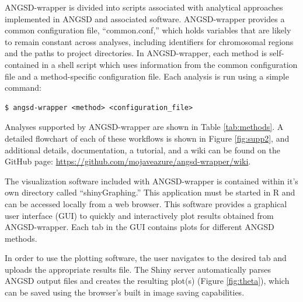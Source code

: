 \documentclass[10pt,a4paper]{article}
\begin{document}
ANGSD-wrapper is divided into scripts associated with analytical approaches implemented in ANGSD and associated software. 
ANGSD-wrapper provides a common configuration file, ``common.conf,'' which holds variables that are likely to remain constant across analyses, including identifiers for chromosomal regions and the paths to project directories.
In ANGSD-wrapper, each method is self-contained in a shell script which uses information from the common configuration file and a method-specific configuration file. 
Each analysis is run using a simple command:

\begin{lstlisting}
$ angsd-wrapper <method> <configuration_file>
\end{lstlisting}

Analyses supported by ANGSD-wrapper are shown in Table \ref{tab:methods}.
A detailed flowchart of each of these workflows is shown in Figure \ref{fig:supp2}, and additional details, documentation, a tutorial, and a wiki can be found on the GitHub page: \url{https://github.com/mojaveazure/angsd-wrapper/wiki}.

The visualization software included with ANGSD-wrapper is contained within it's own directory called ``shinyGraphing.''
This application must be started in R and can be accessed locally from a web browser. 
This software provides a graphical user interface (GUI) to quickly and interactively plot results obtained from ANGSD-wrapper.  
Each tab in the GUI contains plots for different ANGSD methods.

In order to use the plotting software, the user navigates to the desired tab and uploads the appropriate results file. 
The Shiny server automatically parses ANGSD output files and creates the resulting plot(s) (Figure \ref{fig:theta}), which can be saved using the browser's built in image saving capabilities.
\end{document}
